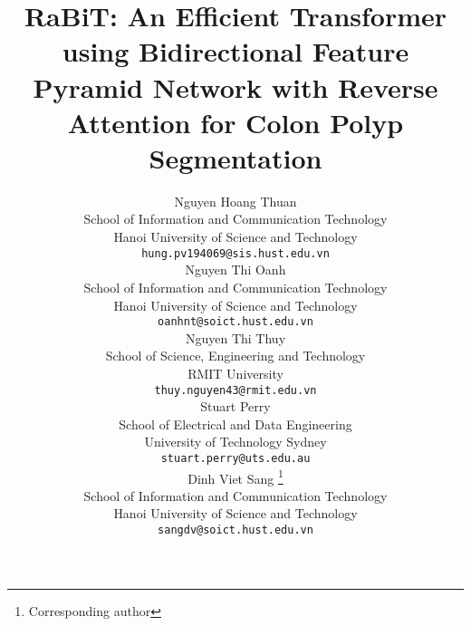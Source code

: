 \documentclass{article}
\begin{document}
\title{RaBiT: An Efficient  Transformer using Bidirectional Feature Pyramid Network with Reverse Attention for Colon Polyp Segmentation}
\author{{Nguyen Hoang Thuan} \\
School of Information and Communication Technology\\
Hanoi University of Science and Technology\\
\texttt{hung.pv194069@sis.hust.edu.vn} \\
\And
{Nguyen Thi Oanh} \\
School of Information and Communication Technology\\
Hanoi University of Science and Technology\\
\texttt{oanhnt@soict.hust.edu.vn} \\
\And
{Nguyen Thi Thuy} \\
School of Science, Engineering and Technology\\
RMIT University\\
\texttt{thuy.nguyen43@rmit.edu.vn} \\
\And
{Stuart Perry} \\
School of Electrical and Data Engineering\\
University of Technology Sydney\\
\texttt{stuart.perry@uts.edu.au} \\
\And
{Dinh Viet Sang} \thanks{Corresponding author}\\
School of Information and Communication Technology\\
Hanoi University of Science and Technology\\
\texttt{sangdv@soict.hust.edu.vn} \\
}

\renewcommand{\shorttitle}{An Efficient  Transformer using Bidirectional Feature Pyramid Network}
\end{document}
